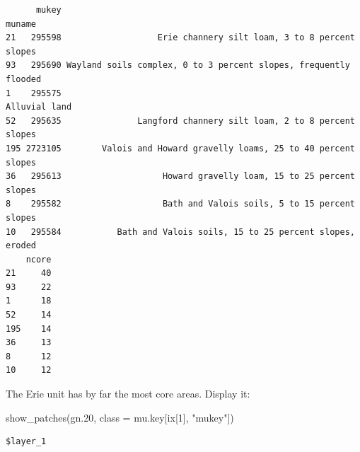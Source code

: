 \documentclass[
  letterpaper,
  DIV=11,
  numbers=noendperiod]{scrartcl}
\newenvironment{Shaded}{\begin{snugshade}}{\end{snugshade}}
\newcommand{\AttributeTok}[1]{\textcolor[rgb]{0.40,0.45,0.13}{#1}}
\newcommand{\DecValTok}[1]{\textcolor[rgb]{0.68,0.00,0.00}{#1}}
\newcommand{\FloatTok}[1]{\textcolor[rgb]{0.68,0.00,0.00}{#1}}
\newcommand{\FunctionTok}[1]{\textcolor[rgb]{0.28,0.35,0.67}{#1}}
\newcommand{\NormalTok}[1]{\textcolor[rgb]{0.00,0.23,0.31}{#1}}
\newcommand{\StringTok}[1]{\textcolor[rgb]{0.13,0.47,0.30}{#1}}
\begin{document}
\begin{verbatim}
      mukey                                                           muname
21   295598                   Erie channery silt loam, 3 to 8 percent slopes
93   295690 Wayland soils complex, 0 to 3 percent slopes, frequently flooded
1    295575                                                    Alluvial land
52   295635               Langford channery silt loam, 2 to 8 percent slopes
195 2723105        Valois and Howard gravelly loams, 25 to 40 percent slopes
36   295613                    Howard gravelly loam, 15 to 25 percent slopes
8    295582                    Bath and Valois soils, 5 to 15 percent slopes
10   295584           Bath and Valois soils, 15 to 25 percent slopes, eroded
    ncore
21     40
93     22
1      18
52     14
195    14
36     13
8      12
10     12
\end{verbatim}

The Erie unit has by far the most core areas. Display it:

\begin{Shaded}
\begin{Highlighting}[]
\FunctionTok{show\_patches}\NormalTok{(gn}\FloatTok{.20}\NormalTok{, }\AttributeTok{class =}\NormalTok{ mu.key[ix[}\DecValTok{1}\NormalTok{], }\StringTok{"mukey"}\NormalTok{])}
\end{Highlighting}
\end{Shaded}

\begin{verbatim}
$layer_1
\end{verbatim}
\end{document}
